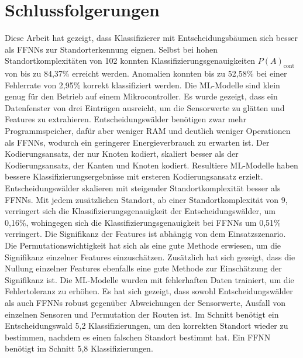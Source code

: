 \chapter{Schlussfolgerungen}
Diese Arbeit hat gezeigt, dass Klassifizierer mit Entscheidungsbäumen sich besser als FFNNs zur Standorterkennung eignen.
Selbst bei hohen Standortkomplexitäten von 102 konnten Klassifizierungsgenauigkeiten $P(A)_{\text{cont}}$ von bis zu 84,37\% erreicht werden.
Anomalien konnten bis zu 52,58\% bei einer Fehlerrate von 2,95\% korrekt klassifiziert werden.
\newline
\newline
Die ML-Modelle sind klein genug für den Betrieb auf einem Mikrocontroller.
Es wurde gezeigt, dass ein Datenfenster von drei Einträgen ausreicht, um die Sensorwerte zu glätten und Features zu extrahieren.
Entscheidungswälder benötigen zwar mehr Programmspeicher, dafür aber weniger RAM und deutlich weniger Operationen als FFNNs, wodurch
ein geringerer Energieverbrauch zu erwarten ist.
\newline
\newline
Der Kodierungsansatz, der nur Knoten kodiert, skaliert besser als der Kodierungsansatz, der Kanten und Knoten kodiert.
Resultiere ML-Modelle haben bessere Klassifizierungsergebnisse mit ersteren Kodierungsansatz erzielt.
Entscheidungswälder skalieren mit steigender Standortkomplexität besser als FFNNs.
Mit jedem zusätzlichen Standort, ab einer Standortkomplexität von 9, verringert sich die Klassifizierungsgenauigkeit der Entscheidungswälder,
um 0,16\%, wohingegen sich die Klassifizierungsgenauigkeit bei FFNNs um 0,51\% verringert.
\newline
\newline
Die Signifikanz der Features ist abhängig von dem Einsatzszenario.
Die Permutationswichtigkeit hat sich als eine gute Methode erwiesen, um die Signifikanz einzelner Features einzuschätzen.
Zusätzlich hat sich gezeigt, dass die Nullung einzelner Features ebenfalls eine gute Methode zur Einschätzung der Signifikanz ist.
\newpage
Die ML-Modelle wurden mit fehlerhaften Daten trainiert, um die Fehlertoleranz zu erhöhen.
Es hat sich gezeigt, dass sowohl Entscheidungswälder als auch FFNNs robust gegenüber Abweichungen der Sensorwerte,
Ausfall von einzelnen Sensoren und Permutation der Routen ist.
Im Schnitt benötigt ein Entscheidungswald 5,2 Klassifizierungen, um den korrekten Standort wieder zu bestimmen,
nachdem es einen falschen Standort bestimmt hat.
Ein FFNN benötigt im Schnitt 5,8 Klassifizierungen.
\newline

